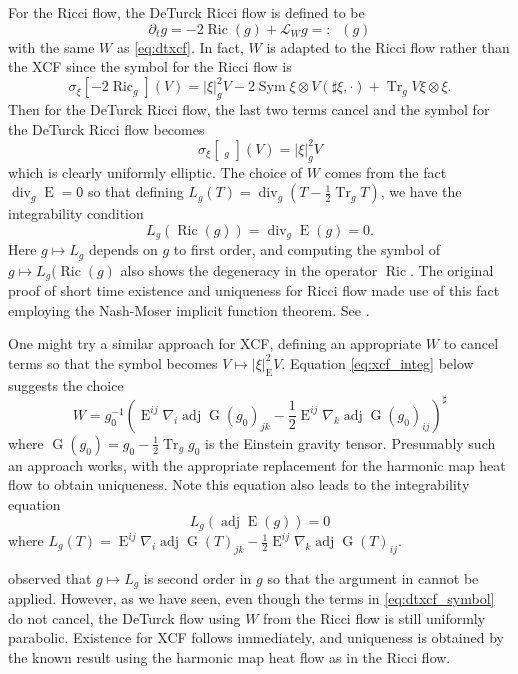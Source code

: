 \documentclass{cambridge7a}
\renewcommand{\~}{\tilde}
\renewcommand{\-}{\bar}
\newcommand{\8}{\infty}
\newcommand{\Lie}{\mathcal{L}}
\newcommand{\abs}[1]{\left\lvert{#1}\right\rvert}
\DeclareMathOperator{\Tr}{Tr}
\DeclareMathOperator{\dive}{div}
\DeclareMathOperator{\Ric}{Ric}
\DeclareMathOperator{\Ein}{E}
\DeclareMathOperator{\Grav}{G}
\DeclareMathOperator{\adj}{adj}
\DeclareMathOperator{\Sym}{Sym}
\DeclareMathOperator{\dtrf}{\Ric_{\operatorname{DT}}}
\begin{document}
\begin{rem}
\label{rem:xcf_rf}

For the Ricci flow, the DeTurck Ricci flow is defined to be
\[
\partial_t g = -2\Ric (g) + \Lie_{W} g =: \dtrf (g)
\]
with the same \(W\) as \eqref{eq:dtxcf}. In fact, \(W\) is adapted to the Ricci flow rather than the XCF since the symbol for the Ricci flow is
\[
\sigma_{\xi} [-2\Ric_g] (V) = \abs{\xi}^2_{g}V - 2 \Sym \xi \otimes V(\sharp \xi, \cdot) + \Tr_g V \xi \otimes \xi.
\]
Then for the DeTurck Ricci flow, the last two terms cancel and the symbol for the DeTurck Ricci flow becomes
\[
\sigma_{\xi} [\dtrf_g] (V) = \abs{\xi}_g^2 V
\]
which is clearly uniformly elliptic. The choice of \(W\) comes from the fact \(\dive_g \Ein = 0\) so that defining \(L_g(T) = \dive_g(T - \tfrac{1}{2} \Tr_g T)\), we have the integrability condition
\[
L_g(\Ric(g)) = \dive_g \Ein(g) = 0.
\]
Here \(g \mapsto L_g\) depends on \(g\) to first order, and computing the symbol of \(g \mapsto L_g(\Ric(g)\) also shows the degeneracy in the operator \(\Ric\). The original proof of short time existence and uniqueness for Ricci flow made use of this fact employing the Nash-Moser implicit function theorem. See \cite[Sections 4-6]{Hamilton:/1982}.

One might try a similar approach for XCF, defining an appropriate \(W\) to cancel terms so that the symbol becomes \(V \mapsto |\xi|_{\Ein}^2 V\). Equation \eqref{eq:xcf_integ} below suggests the choice
\[
W = g_0^{-1}\left(\Ein^{ij} \nabla_i \adj \Grav(g_0)_{jk} - \frac{1}{2} \Ein^{ij} \nabla_k \adj\Grav(g_0)_{ij}\right)^{\sharp}
\]
where \(\Grav(g_0) = g_0 - \tfrac{1}{2} \Tr_g g_0\) is the Einstein gravity tensor. Presumably such an approach works, with the appropriate replacement for the harmonic map heat flow to obtain uniqueness. Note this equation also leads to the integrability equation
\[
L_g(\adj\Ein(g)) = 0
\]
where \(L_g(T) = \Ein^{ij} \nabla_i \adj \Grav(T)_{jk} - \frac{1}{2} \Ein^{ij} \nabla_k \adj\Grav(T)_{ij}\).

\cite{MR2207496} observed that \(g \mapsto L_g\) is second order in \(g\) so that the argument in \cite[Sections 4-6]{Hamilton:/1982} cannot be applied. However, as we have seen, even though the terms in \eqref{eq:dtxcf_symbol} do not cancel, the DeTurck flow using \(W\) from the Ricci flow is still uniformly parabolic. Existence for XCF follows immediately, and uniqueness is obtained by the known result using the harmonic map heat flow as in the Ricci flow.
\end{rem}
\end{document}

